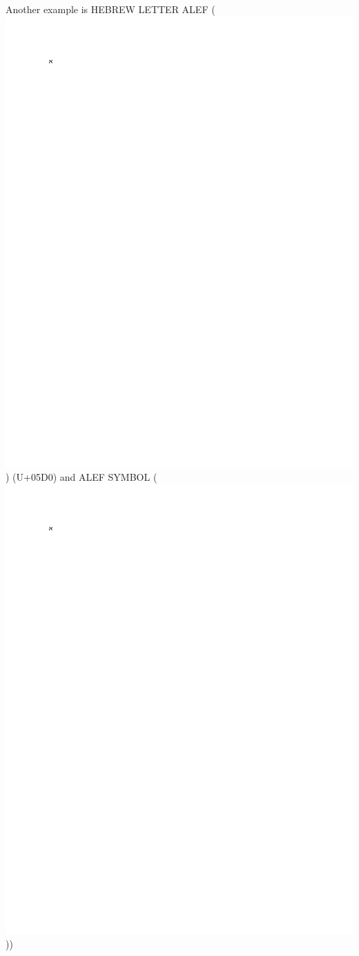 \begin{description}
Another example is HEBREW LETTER ALEF (\includegraphics{uni/unicode_05D0}) (U+05D0) and ALEF SYMBOL (\includegraphics{uni/unicode_2135}))

\end{description}
